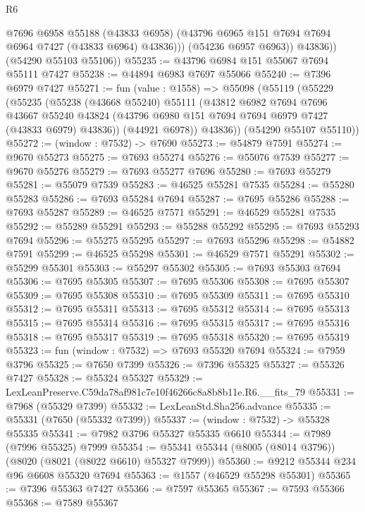 \begin{lexlean}{R6}
\begin{coremodule}
                @7696
                @6958
                @55188
                (@43833 @6958)
                (@43796 @6965 @151 @7694 @7694 @6964 @7427 (@43833 @6964) @43836)))
            (@54236 @6957 @6963))
          @43836))
      (@54290 @55103 @55106))
@55235 := @43796 @6984 @151 @55067 @7694 @55111 @7427
@55238 := @44894 @6983 @7697 @55066
@55240 := @7396 @6979 @7427
@55271 := fun (value : @1558) =>
  @55098
    (@55119
      (@55229
        (@55235
          (@55238
            (@43668 @55240)
            @55111
            (@43812
              @6982
              @7694
              @7696
              @43667
              @55240
              @43824
              (@43796 @6980 @151 @7694 @7694 @6979 @7427 (@43833 @6979) @43836))
            (@44921 @6978))
          @43836))
      (@54290 @55107 @55110))
@55272 := (window : @7532) -> @7690
@55273 := @54879 @7591
@55274 := @9670 @55273
@55275 := @7693 @55274
@55276 := @55076 @7539
@55277 := @9670 @55276
@55279 := @7693 @55277 @7696
@55280 := @7693 @55279
@55281 := @55079 @7539
@55283 := @46525 @55281 @7535
@55284 := @55280 @55283
@55286 := @7693 @55284 @7694
@55287 := @7695 @55286
@55288 := @7693 @55287
@55289 := @46525 @7571
@55291 := @46529 @55281 @7535
@55292 := @55289 @55291
@55293 := @55288 @55292
@55295 := @7693 @55293 @7694
@55296 := @55275 @55295
@55297 := @7693 @55296
@55298 := @54882 @7591
@55299 := @46525 @55298
@55301 := @46529 @7571 @55291
@55302 := @55299 @55301
@55303 := @55297 @55302
@55305 := @7693 @55303 @7694
@55306 := @7695 @55305
@55307 := @7695 @55306
@55308 := @7695 @55307
@55309 := @7695 @55308
@55310 := @7695 @55309
@55311 := @7695 @55310
@55312 := @7695 @55311
@55313 := @7695 @55312
@55314 := @7695 @55313
@55315 := @7695 @55314
@55316 := @7695 @55315
@55317 := @7695 @55316
@55318 := @7695 @55317
@55319 := @7695 @55318
@55320 := @7695 @55319
@55323 := fun (window : @7532) => @7693 @55320 @7694
@55324 := @7959 @3796
@55325 := @7650 @7399
@55326 := @7396 @55325
@55327 := @55326 @7427
@55328 := @55324 @55327
@55329 := LexLeanPreserve.C59da78af981c7e10f46266c8a8b8b11e.R6.__fits_79
@55331 := @7968 (@55329 @7399)
@55332 := LexLeanStd.Sha256.advance
@55335 := @55331 (@7650 (@55332 @7399))
@55337 := (window : @7532) -> @55328 @55335
@55341 := @7982 @3796 @55327 @55335 @6610
@55344 := @7989 (@7996 @55325) @7999
@55354 := @55341 @55344 (@8005 (@8014 @3796)) (@8020 (@8021 (@8022 @6610) @55327 @7999))
@55360 := @9212 @55344 @234 @96 @6608 @55320 @7694
@55363 := @1557 (@46529 @55298 @55301)
@55365 := @7396 @55363 @7427
@55366 := @7597 @55365
@55367 := @7593 @55366
@55368 := @7589 @55367

\end{coremodule}
\end{lexlean}
